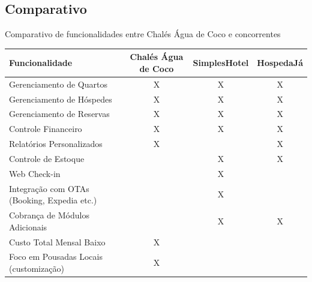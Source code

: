 \documentclass[
	12pt,				%
	openany,			%
	oneside,			%
	a4paper,			%
	english,			%
	french,				%
	spanish,			%
	brazil				%
	]{abntex2}
\begin{document}
\subsection{Comparativo}
\begin{quadro}[H]
	\caption{Comparativo de funcionalidades entre Chalés Água de Coco e concorrentes}
	\label{quadro_comparativo}
	\begin{tabular}{|p{5cm}|c|c|c|}
		\hline
		\textbf{Funcionalidade} & \textbf{Chalés Água de Coco} & \textbf{SimplesHotel} & \textbf{HospedaJá} \\
		\hline
		Gerenciamento de Quartos & X & X & X \\
		\hline
		Gerenciamento de Hóspedes & X & X & X \\
		\hline
		Gerenciamento de Reservas & X & X & X \\
		\hline
		Controle Financeiro & X & X & X \\
		\hline
		Relatórios Personalizados & X &  & X \\
		\hline
		Controle de Estoque &  & X & X \\
		\hline
		Web Check-in &  & X &  \\
		\hline
		Integração com OTAs (Booking, Expedia etc.) &  & X &  \\
		\hline
		Cobrança de Módulos Adicionais &  & X & X \\
		\hline
		Custo Total Mensal Baixo & X &  &  \\
		\hline
		Foco em Pousadas Locais (customização) & X &  &  \\
		\hline
	\end{tabular}
\end{quadro}

%


\end{document}
